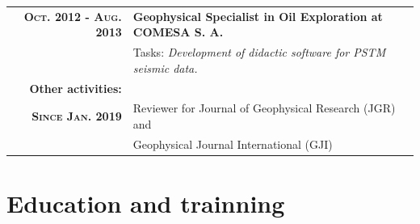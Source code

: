\documentclass[a4paper]{article} %
\begin{document}
\begin{tabular}{rp{12cm}}
{\bf \textsc{Oct. 2012 - Aug. 2013}} & {\bf Geophysical Specialist in Oil Exploration at \textsc{COMESA S. A.}} \\
& Tasks: \emph{Development of didactic software for PSTM seismic data.}\\[0.6em]
{\bf Other activities:}\\[0.6em]
{\bf \textsc{Since Jan.} 2019} & Reviewer for Journal of Geophysical Research (JGR) and \\
			       & Geophysical Journal International (GJI)\\[0.6em]
\end{tabular}

\vskip 0cm
\section{Education and trainning}
\end{document}
